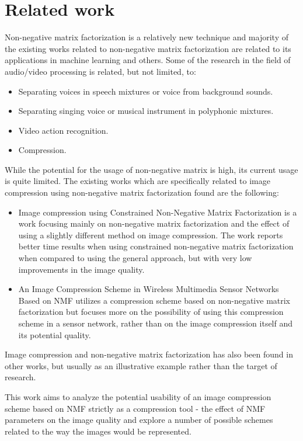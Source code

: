 \documentclass[thesis=M,english]{FITthesis}[2012/10/20]
\begin{document}
\section{Related work}
Non-negative matrix factorization is a relatively new technique and majority of
the existing works related to non-negative matrix factorization are related to
its applications in machine learning and others. Some of the research in the field
of audio/video processing is related, but not limited, to:
\begin{itemize}
  \item Separating voices in speech mixtures or voice from background sounds. \cite{audioseparate}
  \item Separating singing voice or musical instrument in polyphonic mixtures. \cite{audioseparate2}
  \item Video action recognition. \cite{videorecognition}
  \item Compression.
\end{itemize}

While the potential for the usage of non-negative matrix is high, its current usage
is quite limited. The existing works which are specifically related to image compression
using non-negative matrix factorization found are the following:
\begin{itemize}
  \item Image compression using Constrained Non-Negative Matrix Factorization \cite{imgcnmf}
  is a work focusing mainly on non-negative matrix factorization and the effect of using
  a slightly different method on image compression. The work reports better time results when using constrained
  non-negative matrix factorization when compared to using the general approach, but with very low improvements
  in the image quality.
  \item An Image Compression Scheme in Wireless Multimedia Sensor Networks Based on NMF \cite{wirelessnmf}
  utilizes a compression scheme based on non-negative matrix factorization but focuses more on
  the possibility of using this compression scheme in a sensor network, rather than on the
  image compression itself and its potential quality.
\end{itemize}

Image compression and non-negative matrix factorization has also been found in other works, but
usually as an illustrative example rather than the target of research.

This work aims to analyze the potential usability of an image compression scheme based on NMF
strictly as a compression tool - the effect of NMF parameters on the image quality and explore
a number of possible schemes related to the way the images would be represented.
\end{document}
